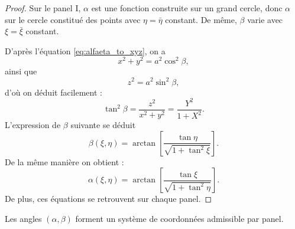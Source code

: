 \begin{proof}
Sur le panel I, $\alpha$ est une fonction construite sur un grand cercle, donc $\alpha$ sur le cercle constitué des points avec $\eta=\bar{\eta}$ constant. De même, $\beta$ varie avec $\xi= \bar{\xi}$ constant. 

D'après l'équation \eqref{eq:alfaeta_to_xyz}, on a
\begin{equation}
x^2 + y^2 = a^2 \cos^2 \beta,
\end{equation}
ainsi que
\begin{equation}
z^2 = a^2 \sin^2 \beta,
\end{equation}
d'où on déduit facilement :
\begin{equation}
\tan^2 \beta = \dfrac{z^2}{x^2+y^2} = \dfrac{Y^2}{1+X^2}.
\end{equation}
L'expression de $\beta$ suivante se déduit
\begin{equation}
\beta(\xi, \eta) = \arctan \left[ \dfrac{\tan \eta}{\sqrt{1+\tan^2 \xi}} \right].
\end{equation}
De la même manière on obtient :
\begin{equation}
\alpha(\xi, \eta) = \arctan \left[ \dfrac{\tan \xi}{\sqrt{1+\tan^2 \eta}} \right].
\end{equation}
De plus, ces équations se retrouvent sur chaque panel.
\end{proof}


\begin{theoreme}
Les angles $(\alpha, \beta)$ forment un système de coordonnées admissible par panel.
\end{theoreme}







